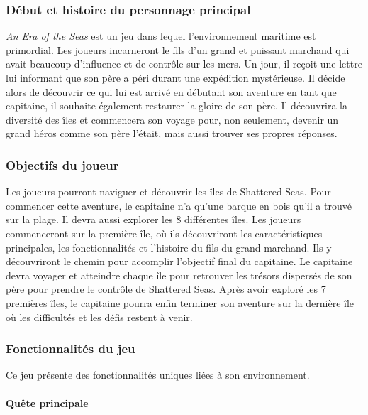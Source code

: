 \documentclass{article}
\begin{document}
\subsubsection{Début et histoire du personnage principal}\hfill

\textit{An Era of the Seas} est un jeu dans lequel l’environnement maritime est primordial. Les joueurs incarneront le fils d’un grand et puissant marchand qui avait beaucoup d’influence et de contrôle sur les mers. Un jour, il reçoit une lettre lui informant que son père a péri durant une expédition mystérieuse. Il décide alors de découvrir ce qui lui est arrivé en débutant son aventure en tant que capitaine, il souhaite également restaurer la gloire de son père. Il découvrira la diversité des îles et commencera son voyage pour, non seulement, devenir un grand héros comme son père l’était, mais aussi trouver ses propres réponses.



\subsubsection{Objectifs du joueur}\hfill

Les joueurs pourront naviguer et découvrir les îles de Shattered Seas. Pour commencer cette aventure, le capitaine n'a qu’une barque en bois qu’il a trouvé sur la plage. Il devra aussi explorer les 8 différentes îles. Les joueurs commenceront sur la première île, où ils découvriront les caractéristiques principales, les fonctionnalités et l’histoire du fils du grand marchand. Ils y découvriront le chemin pour accomplir l’objectif final du capitaine. Le capitaine devra voyager et atteindre chaque île pour retrouver les trésors dispersés de son père pour prendre le contrôle de Shattered Seas. Après avoir exploré les 7 premières îles, le capitaine pourra enfin terminer son aventure sur la dernière île où les difficultés et les défis restent à venir.



\subsubsection{Fonctionnalités du jeu}\hfill

Ce jeu présente des fonctionnalités uniques liées à son environnement.

\paragraph{Quête principale}\hfill
\end{document}
